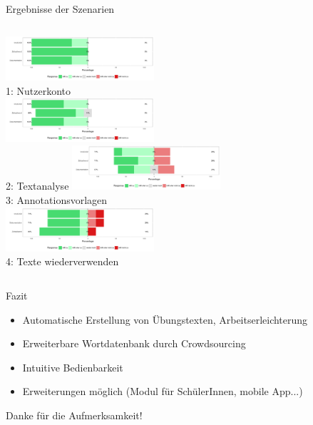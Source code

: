 \documentclass{beamer}
\begin{document}
\begin{frame}{Ergebnisse der Szenarien}
\begin{columns}[t]
	\centering
	\includegraphics[width=5.5cm]{../figures/evaluation/scenario1}\\
	1: Nutzerkonto\\
	[1.5cm]
	\includegraphics[width=5.5cm]{../figures/evaluation/scenario2}\\
	2: Textanalyse
	\centering
	\includegraphics[width=5.5cm]{../figures/evaluation/scenario3}\\
	3: Annotationsvorlagen\\
	[1.5cm]
	\includegraphics[width=5.5cm]{../figures/evaluation/scenario4}\\
	4: Texte wiederverwenden
\end{columns}
\end{frame}

\begin{frame}{Fazit}
\begin{itemize}
	\item Automatische Erstellung von Übungstexten, Arbeitserleichterung
	\item Erweiterbare Wortdatenbank durch Crowdsourcing
	\item Intuitive Bedienbarkeit
	\item Erweiterungen möglich (Modul für SchülerInnen, mobile App...)
\end{itemize}
\end{frame}

\begin{frame}[plain]
\centering
\huge{Danke für die Aufmerksamkeit!}
\\
[1cm]
\huge{\color{beaver}{$\rightarrow$ Fragen und Demo}}
\end{frame}
\end{document}

